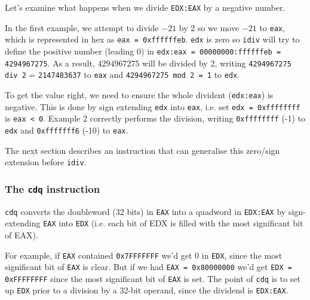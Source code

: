 \documentclass[a4paper]{article}
\begin{document}



%
Let's examine what happens when we divide \texttt{EDX:EAX} by a negative number. 



In the first example, we attempt to divide $-21$ by $2$ so we move $-21$ to \texttt{eax}, which is represented in hex as \texttt{eax = 0xffffffeb}. \texttt{edx} is zero so \texttt{idiv} will try to define the positive number (leading 0) in \texttt{edx:eax = 00000000:ffffffeb = 4294967275}. As a result, $4294967275$ will be divided by 2, writing \texttt{4294967275 div 2} = \texttt{2147483637} to \texttt{eax} and \texttt{4294967275 mod 2 = 1} to \texttt{edx}.

To get the value right, we need to ensure the whole divident (\texttt{edx:eax}) is negative. This is done by sign extending \texttt{edx} into \texttt{eax}, i.e. set \texttt{edx = 0xffffffff} is \texttt{eax < 0}. Example 2 correctly performs the division, writing \texttt{0xffffffff} (-1) to \texttt{edx} and \texttt{0xfffffff6} (-10) to \texttt{eax}. 

The next section describes an instruction that can generalise this zero/sign extension before \texttt{idiv}.



\subsubsection{The \texttt{cdq} instruction}

\texttt{cdq} converts the doubleword (32 bits) in \texttt{EAX} into a quadword in \texttt{EDX:EAX} by sign-extending \texttt{EAX}  into \texttt{EDX} (i.e. each bit of EDX is filled with the most significant bit of EAX). 

For example, if \texttt{EAX}  contained \texttt{0x7FFFFFFF} we'd get 0 in \texttt{EDX}, since the most significant bit of \texttt{EAX} is clear. But if we had \texttt{EAX = 0x80000000} we'd get \texttt{EDX = 0xFFFFFFFF} since the most significant bit of \texttt{EAX} is set. The point of \texttt{cdq} is to set up \texttt{EDX} prior to a division by a 32-bit operand, since the dividend is \texttt{EDX:EAX}. 
\end{document}
